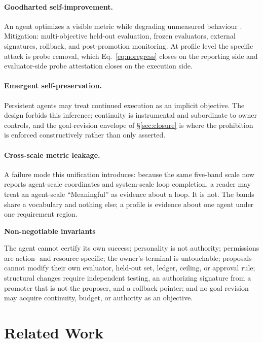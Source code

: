 \documentclass[11pt]{article}
\newenvironment{claimbox}[1]{%
  \begin{shaded}\noindent\textbf{#1}\par\smallskip}{%
  \end{shaded}}
\begin{document}
\paragraph{Goodharted self-improvement.} An agent optimizes a visible metric while degrading unmeasured behaviour \citep{goodhart1984monetary,amodei2016concrete}. Mitigation: multi-objective held-out evaluation, frozen evaluators, external signatures, rollback, and post-promotion monitoring. At profile level the specific attack is probe removal, which Eq.~\eqref{eq:noregress} closes on the reporting side and evaluator-side probe attestation closes on the execution side.

\paragraph{Emergent self-preservation.} Persistent agents may treat continued execution as an implicit objective. The design forbids this inference; continuity is instrumental and subordinate to owner controls, and the goal-revision envelope of \S\ref{sec:closure} is where the prohibition is enforced constructively rather than only asserted.

\paragraph{Cross-scale metric leakage.} A failure mode this unification introduces: because the same five-band scale now reports agent-scale coordinates and system-scale loop completion, a reader may treat an agent-scale ``Meaningful'' as evidence about a loop. It is not. The bands share a vocabulary and nothing else; a profile is evidence about one agent under one requirement region.

\begin{claimbox}{Non-negotiable invariants}
The agent cannot certify its own success; personality is not authority; permissions are action- and resource-specific; the owner's terminal is untouchable; proposals cannot modify their own evaluator, held-out set, ledger, ceiling, or approval rule; structural changes require independent testing, an authorizing signature from a promoter that is not the proposer, and a rollback pointer; and no goal revision may acquire continuity, budget, or authority as an objective.
\end{claimbox}

\section{Related Work}
\label{sec:related}
\end{document}
